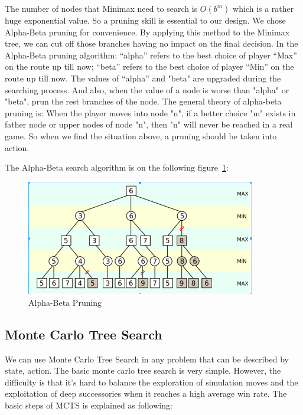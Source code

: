 \documentclass[11pt, a4paper]{article}
\begin{document}
The number of nodes that Minimax need to search is $O(b^m)$ which is a rather huge exponential value. So a pruning skill is essential to our design. We chose Alpha-Beta pruning for convenience. By applying this method to the Minimax tree, we can cut off those branches having no impact on the final decision.
In the Alpha-Beta pruning algorithm: “alpha” refers to the best choice of player “Max” on the route up till now; “beta” refers to the best choice of player “Min” on the route up till now.
The values of “alpha” and "beta" are upgraded during the searching process. And also, when the value of a node is worse than "alpha" or "beta", prun the rest branches of the node. The general theory of alpha-beta pruning is: When the player moves into node "n", if a better choice "m" exists in father node or upper nodes of node "n", then "n" will never be reached in a real game. So when we find the situation above, a pruning should be taken into action.

The Alpha-Beta search algorithm is on the following figure~\ref{Fig:ab}:

\begin{figure}[htbp]
	
	\centering %
	\includegraphics[width=10cm]{alpha_beta}
	
	\caption{Alpha-Beta Pruning}
	\label{Fig:ab}
	
\end{figure}

\subsection{Monte Carlo Tree Search}

We can use Monte Carlo Tree Search in any problem that can be described by {state, action}. The basic monte carlo tree search is very simple. However, the difficulty is that it’s hard to balance the exploration of simulation moves and the exploitation of deep successories when it reaches a high average win rate. The basic steps of MCTS is explained as following:
\end{document}

